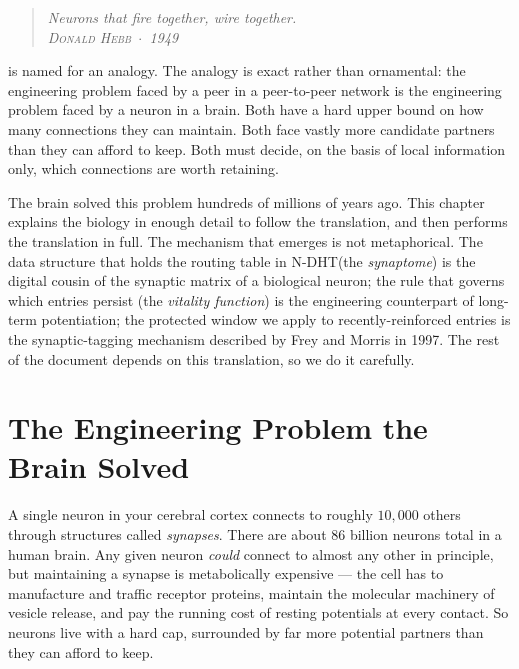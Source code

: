\documentclass[twoside,nobib]{tufte-book}
\newcommand{\NDHT}{N-DHT\xspace}
\begin{document}
\begin{quote}
  \itshape Neurons that fire together, wire together.\\[0.3em]
  \normalfont\textsc{\footnotesize Donald Hebb} \,$\cdot$\, 1949
\end{quote}

 is named for an analogy. The
analogy is exact rather than ornamental: the engineering problem
faced by a peer in a peer-to-peer network is the engineering
problem faced by a neuron in a brain. Both have a hard upper bound
on how many connections they can maintain. Both face vastly more
candidate partners than they can afford to keep. Both must decide,
on the basis of local information only, which connections are
worth retaining.

The brain solved this problem hundreds of millions of years ago.
This chapter explains the biology in enough detail to follow the
translation, and then performs the translation in full. The
mechanism that emerges is not metaphorical. The data structure
that holds the routing table in \NDHT (the \emph{synaptome}) is
the digital cousin of the synaptic matrix of a biological neuron;
the rule that governs which entries persist (the \emph{vitality
function}) is the engineering counterpart of long-term potentiation;
the protected window we apply to recently-reinforced entries is
the synaptic-tagging mechanism described by Frey and Morris in
1997. The rest of the document depends on this translation, so we
do it carefully.

\section{The Engineering Problem the Brain Solved}

A single neuron in your cerebral cortex connects to roughly $10{,}000$
others through structures called \emph{synapses}.
There are about $86$ billion neurons total in a human
brain.
Any given neuron \emph{could} connect to almost any other in
principle, but maintaining a synapse is metabolically
expensive --- the cell has to manufacture and traffic receptor
proteins, maintain the molecular machinery of vesicle release,
and pay the running cost of resting potentials at every
contact. So neurons live with a hard cap, surrounded by far more
potential partners than they can afford to keep.
\end{document}
